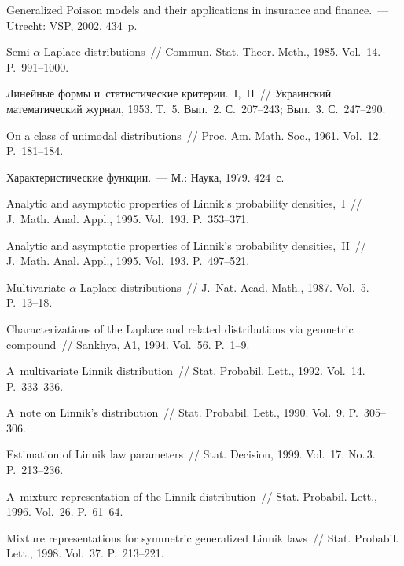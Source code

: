 \begin{multicols}{2}
{{\begin{thebibliography}{99}
Generalized Poisson models and their applications in insurance and finance.~--- 
Utrecht: VSP, 2002. 434~p.

  Semi-$\alpha$-Laplace distributions~//
Commun. Stat. Theor. Meth., 1985. Vol.~14. P.~991--1000.

 Линейные формы и~статистические критерии.~I,~II~// 
Украинский математический журнал, 1953. Т.~5. Вып.~2. С.~207--243; 
Вып.~3. С.~247--290.

 On a class of unimodal distributions~// 
Proc. Am. Math. Soc., 1961. Vol.~12. P.~181--184.

 Характеристические функции.~--- М.: Наука, 1979. 424~с.

 Analytic and asymptotic properties 
of Linnik's probability densities,~I~// J.~Math. Anal. Appl., 1995. Vol.~193. P.~353--371.

Analytic and asymptotic properties of Linnik's probability densities,~II~// 
J.~Math. Anal. Appl., 1995. Vol.~193. P.~497--521.

 Multivariate $\alpha$-Laplace distributions~// 
J.~Nat. Acad. Math., 1987. Vol.~5. P.~13--18.

 Characterizations of the Laplace and related distributions 
via geometric compound~// Sankhya, A1, 1994. Vol.~56. P.~1--9.

 A~multivariate Linnik distribution~// 
Stat. Probabil. Lett., 1992. Vol.~14. P.~333--336.

 A~note on Linnik's distribution~// 
Stat. Probabil. Lett., 1990. Vol.~9. P.~305--306.

Estimation of Linnik law parameters~// Stat. Decision, 1999. Vol.~17. No.\,3. P.~213--236.


 A~mixture representation of the Linnik distribution~// 
Stat. Probabil. Lett., 1996. Vol.~26. P.~61--64.

 Mixture representations for symmetric generalized Linnik laws~// 
Stat. Probabil. Lett., 1998. Vol.~37. P.~213--221.


\end{thebibliography}}}
\end{multicols}
